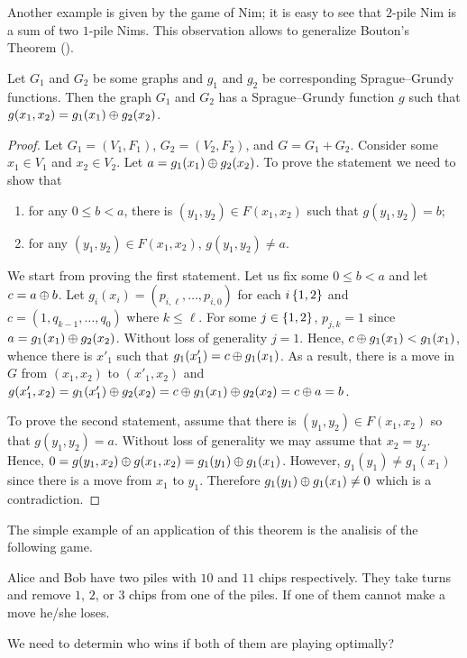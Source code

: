 Another example is given by the game of Nim; it is easy to see that
$2$-pile Nim is a sum of two $1$-pile Nims. This observation allows to generalize
Bouton's Theorem ().
\begin{theorem}
    Let $G_1$ and $G_2$ be some graphs and $g_1$ and $g_2$ be corresponding
    Sprague--Grundy functions. Then the graph $G_1$ and $G_2$ has a
    Sprague--Grundy function $g$ such that
    $g(x_1, x_2) = g_1(x_1) \oplus g_2(x_2)$.
\end{theorem}
\begin{proof}
    Let $G_1 = (V_1, F_1)$, $G_2 = (V_2, F_2)$, and $G = G_1 + G_2$.
    Consider some $x_1 \in V_1$ and $x_2 \in V_2$.
    Let $a = g_1(x_1) \oplus g_2(x_2)$. To prove the statement we need to
    show that
    \begin{enumerate}
        \item for any $0 \le b < a$, there is $(y_1, y_2) \in F(x_1, x_2)$ such
            that $g(y_1, y_2) = b$;
        \item for any $(y_1, y_2) \in F(x_1, x_2)$, $g(y_1, y_2) \neq a$.
    \end{enumerate}

    We start from proving the first statement.
    Let us fix some $0 \le b < a$ and let $c = a \oplus b$.
    Let $g_i(x_i) = (p_{i, \ell}, \dots, p_{i, 0})$ for each $i \set{1, 2}$ and
    $c = (1, q_{k - 1}, \dots, q_0)$ where $k \le \ell$.
    For some $j \in \set{1, 2}$, $p_{j, k} = 1$ since
    $a = g_1(x_1) \oplus g_2(x_2)$. Without loss of generality $j = 1$.
    Hence, $c \oplus g_1(x_1) < g_1(x_1)$, whence there is $x'_1$ such
    that $g_1(x'_1) = c \oplus g_1(x_1)$. As a result, there is a move in
    $G$ from $(x_1, x_2)$ to $(x'_1, x_2)$ and
    $g(x'_1, x_2) = g_1(x'_1) \oplus g_2(x_2) =
        c \oplus g_1(x_1) \oplus g_2(x_2) =
        c \oplus a = b$.

    To prove the second statement, assume that there is
    $(y_1, y_2) \in F(x_1, x_2)$ so that $g(y_1, y_2) = a$. Without loss of
    generality we may assume that $x_2 = y_2$. Hence,
    $0 = g(y_1, x_2) \oplus g(x_1, x_2) = g_1(y_1) \oplus g_1(x_1)$.
    However, $g_1(y_1) \neq g_1(x_1)$ since there is a move from $x_1$ to $y_1$.
    Therefore $g_1(y_1) \oplus g_1(x_1) \neq 0$ which is a contradiction.
\end{proof}

The simple example of an application of this theorem is the analisis of the
following game.
\begin{game}
\label{game:subtraction-1-2-3-out-of-10-11}
  Alice and Bob have two piles with $10$ and $11$ chips respectively.
  They take turns and remove $1$, $2$, or $3$ chips from one of the piles.
  If one of them cannot make a move he/she loses.
\end{game}
We need to determin who wins if both of them are playing optimally?


